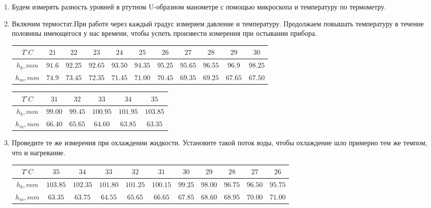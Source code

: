 \documentclass[12pt,a4paper]{article}
\begin{document}
	\begin{enumerate}
		\item Будем измерять разность уровней в ртутном U-образном манометре с помощью микроскопа и температуру по термометру.
		\item Включим термостат.При работе через каждый градус измеряем давление и температуру. Продолжаем повышать температуру в течение половины имеющегося у нас времени, чтобы успеть произвести измерения при остывании прибора.\\
		
			\begin{tabular}{| c | c | c | c | c | c | c | c | c | c | c |} \hline
				$T^\circ C$ & $21$ & $22$ & $23$ & $24$ & $25$ & $26$ & $27$ & $28$ & $29$ & $30$ \\ \hline
				$h_b, mm$ & $91.6$ & $92.25$ & $92.65$ & $93.50$ & $94.35$ & $95.25$ & $95.65$ & $96.55$ & $96.9$ & $98.25$ \\ \hline
				
				$h_m, mm$ & $74.9$ & $73.45$ & $72.35$ & $71.45$ & $71.00$ & $70.45$ & $69.35$ & $69.25$ & $67.65$ & $67.50$ \\ \hline
			\end{tabular}				
			
			\begin{tabular}{| c | c | c | c | c | c |} \hline
				$T^\circ C$ & $31$ & $32$ & $33$ & $34$ & $35$ \\ \hline
				$h_b, mm$ & $99.00$ & $99.45$ & $100.95$ & $101.95$ & $103.85$ \\ \hline
				$h_m, mm$ & $66.40$ & $65.65$ & $64.60$ & $63.85$ & $63.35$ \\ \hline
			\end{tabular}
			
		\item Проведите те же измерения при охлаждении жидкости. Установите такой поток воды, чтобы охлаждение шло примерно тем же темпом, что и нагревание.\\
		
			\begin{tabular}{| c | c | c | c | c | c | c | c | c | c | c |} \hline
				$T^\circ C$ & $35$ & $34$ & $33$ & $32$ & $31$ & $30$ & $29$ & $28$ & $27$ & $26$ \\ \hline
				$h_b, mm$ & $103.85$ & $102.35$ & $101.80$ & $101.25$ & $100.15$ & $99.25$ & $98.00$ & $96.75$ & $96.50$ & $95.75$ \\ \hline
				
				$h_m, mm$ & $63.35$ & $63.75$ & $64.55$ & $65.65$ & $66.65$ & $67.85$ & $68.60$ & $68.95$ & $70.00$ & $71.00$ \\ \hline
			\end{tabular}				
			

\end{enumerate}
\end{document}
